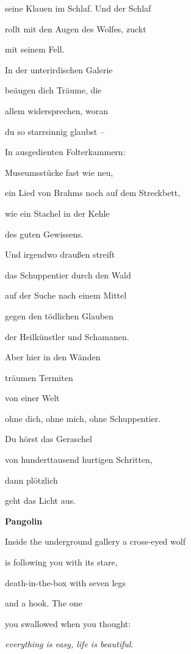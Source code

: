 seine Klauen im Schlaf. Und der Schlaf 

rollt mit den Augen des Wolfes, zuckt 

mit seinem Fell.


\bigskip

In der unterirdischen Galerie 

beäugen dich Träume, die 

allem widersprechen, woran 

du so starrsinnig glaubst -- 

In ausgedienten Folterkammern:

Museumsstücke fast wie neu,

ein Lied von Brahms noch auf dem Streckbett,

wie ein Stachel in der Kehle

des guten Gewissens.


\bigskip

Und irgendwo draußen streift 

das Schuppentier durch den Wald

auf der Suche nach einem Mittel 

gegen den tödlichen Glauben 

der Heilkünstler und Schamanen.


\bigskip

Aber hier in den Wänden

träumen Termiten 

von einer Welt

ohne dich, ohne mich, ohne Schuppentier.


\bigskip

Du hörst das Geraschel

von hunderttausend hurtigen Schritten, 

dann plötzlich 

geht das Licht aus.


\bigskip

\clearpage
\bigskip

{\bfseries
Pangolin}


\bigskip

Inside the underground gallery a cross-eyed wolf

is following you with its stare,

death-in-the-box with seven legs

and a hook. The one 

you swallowed when you thought:

\emph{everything is easy, life is beautiful}.

